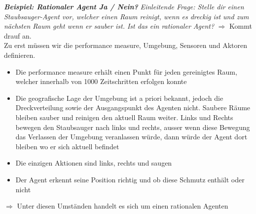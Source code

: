 \documentclass{article}
\theoremstyle{merke}
\theoremstyle{definition}
\begin{document}
\textbf{\textit{Beispiel: Rationaler Agent Ja / Nein?}}
\textit{Einleitende Frage: Stelle dir einen Staubsauger-Agent vor, welcher einen Raum reinigt, wenn es dreckig ist und zum nächsten Raum geht wenn er sauber ist. Ist das ein rationaler Agent?}
$\Rightarrow$ Kommt drauf an. \\
Zu erst müssen wir die performance measure, Umgebung, Sensoren und Aktoren definieren.
\begin{itemize}
\item Die performance measure erhält einen Punkt für jeden gereinigtes Raum, welcher innerhalb von 1000 Zeitschritten erfolgen konnte
\item Die geografische Lage der Umgebung ist a priori bekannt, jedoch die Dreckverteilung sowie der Ausgangspunkt des Agenten nicht. Saubere Räume bleiben sauber und reinigen den aktuell Raum weiter. Links und Rechts bewegen den Staubsauger nach links und rechts, ausser wenn diese Bewegung das Verlassen der Umgebung veranlassen würde, dann würde der Agent dort bleiben wo er sich aktuell befindet
\item Die einzigen Aktionen sind links, rechts und saugen
\item Der Agent erkennt seine Position richtig und ob diese Schmutz enthält oder nicht
\end{itemize}
$\Rightarrow$ Unter diesen Umständen handelt es sich um einen rationalen Agenten
\end{document}
